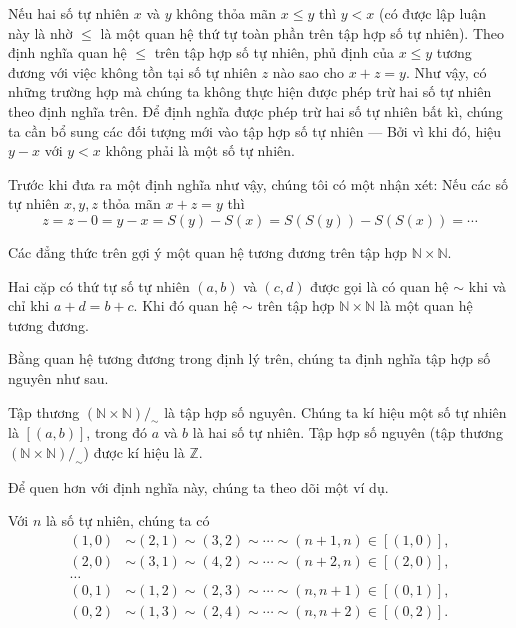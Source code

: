 Nếu hai số tự nhiên $x$ và $y$ không thỏa mãn $x\leq y$ thì $y < x$ (có được lập luận này là nhờ $\leq$ là một quan hệ thứ tự toàn phần trên tập hợp số tự nhiên). Theo định nghĩa quan hệ $\leq$ trên tập hợp số tự nhiên, phủ định của $x\leq y$ tương đương với việc không tồn tại số tự nhiên $z$ nào sao cho $x + z = y$. Như vậy, có những trường hợp mà chúng ta không thực hiện được phép trừ hai số tự nhiên theo định nghĩa trên. Để định nghĩa được phép trừ hai số tự nhiên bất kì, chúng ta cần bổ sung các đối tượng mới vào tập hợp số tự nhiên --- Bởi vì khi đó, hiệu $y - x$ với $y < x$ không phải là một số tự nhiên.

Trước khi đưa ra một định nghĩa như vậy, chúng tôi có một nhận xét: Nếu các số tự nhiên $x, y, z$ thỏa mãn $x + z = y$ thì
\[
    z = z - 0 = y - x = S(y) - S(x) = S(S(y)) - S(S(x)) = \cdots
\]

Các đẳng thức trên gợi ý một quan hệ tương đương trên tập hợp $\mathbb{N}\times\mathbb{N}$.
\begin{theorem}
    Hai cặp có thứ tự số tự nhiên $(a, b)$ và $(c, d)$ được gọi là có quan hệ $\sim$ khi và chỉ khi $a + d = b + c$. Khi đó quan hệ $\sim$ trên tập hợp $\mathbb{N}\times\mathbb{N}$ là một quan hệ tương đương.
\end{theorem}

Bằng quan hệ tương đương trong định lý trên, chúng ta định nghĩa tập hợp số nguyên như sau.
\begin{definition}
    Tập thương $(\mathbb{N}\times\mathbb{N})/_{\sim}$ là tập hợp số nguyên. Chúng ta kí hiệu một số tự nhiên là $[(a, b)]$, trong đó $a$ và $b$ là hai số tự nhiên. Tập hợp số nguyên (tập thương $(\mathbb{N}\times\mathbb{N})/_{\sim}$) được kí hiệu là $\mathbb{Z}$.
\end{definition}

Để quen hơn với định nghĩa này, chúng ta theo dõi một ví dụ.
\begin{example}
    Với $n$ là số tự nhiên, chúng ta có
    \begin{align*}
        (1, 0) & \sim (2, 1) \sim (3, 2) \sim \cdots \sim (n+1, n) \in [(1, 0)], \\
        (2, 0) & \sim (3, 1) \sim (4, 2) \sim \cdots \sim (n+2, n) \in [(2, 0)], \\
        \ldots                                                                   \\
        (0, 1) & \sim (1, 2) \sim (2, 3) \sim \cdots \sim (n, n+1) \in [(0, 1)], \\
        (0, 2) & \sim (1, 3) \sim (2, 4) \sim \cdots \sim (n, n+2) \in [(0, 2)].
    \end{align*}
\end{example}

